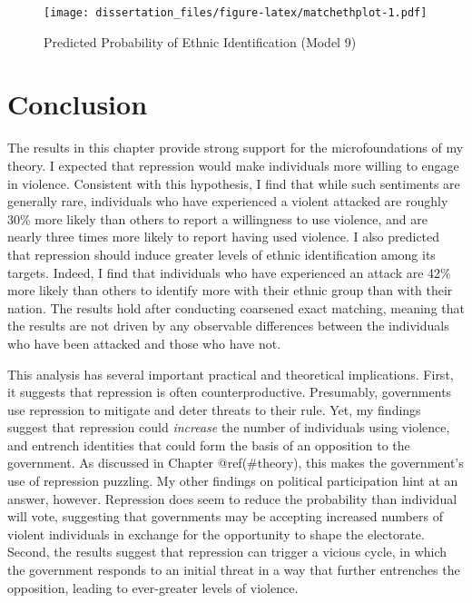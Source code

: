 \documentclass[12pt,]{book}
\theoremstyle{definition}
\theoremstyle{definition}
\theoremstyle{definition}
\theoremstyle{remark}
\begin{document}
\begin{figure}
\centering
\texttt{[image: dissertation\_files/figure-latex/matchethplot-1.pdf]}
\caption{\label{fig:matchethplot}Predicted Probability of Ethnic
Identification (Model 9)}
\end{figure}

\hypertarget{survey-conclusion}{%
\section{Conclusion}\label{survey-conclusion}}

The results in this chapter provide strong support for the
microfoundations of my theory. I expected that repression would make
individuals more willing to engage in violence. Consistent with this
hypothesis, I find that while such sentiments are generally rare,
individuals who have experienced a violent attacked are roughly 30\%
more likely than others to report a willingness to use violence, and are
nearly three times more likely to report having used violence. I also
predicted that repression should induce greater levels of ethnic
identification among its targets. Indeed, I find that individuals who
have experienced an attack are 42\% more likely than others to identify
more with their ethnic group than with their nation. The results hold
after conducting coarsened exact matching, meaning that the results are
not driven by any observable differences between the individuals who
have been attacked and those who have not.

This analysis has several important practical and theoretical
implications. First, it suggests that repression is often
counterproductive. Presumably, governments use repression to mitigate
and deter threats to their rule. Yet, my findings suggest that
repression could \emph{increase} the number of individuals using
violence, and entrench identities that could form the basis of an
opposition to the government. As discussed in Chapter @ref(\#theory),
this makes the government's use of repression puzzling. My other
findings on political participation hint at an answer, however.
Repression does seem to reduce the probability than individual will
vote, suggesting that governments may be accepting increased numbers of
violent individuals in exchange for the opportunity to shape the
electorate. Second, the results suggest that repression can trigger a
vicious cycle, in which the government responds to an initial threat in
a way that further entrenches the opposition, leading to ever-greater
levels of violence.
\end{document}
